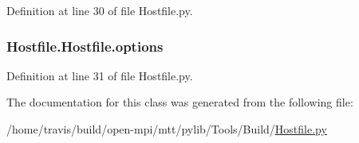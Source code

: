Definition at line 30 of file Hostfile.\-py.

\hypertarget{classHostfile_1_1Hostfile_a3b460597c8d5a628c265573aa532a568}{
\subsubsection[{options}]{\setlength{\rightskip}{0pt plus 5cm}Hostfile.\-Hostfile.\-options}}\label{classHostfile_1_1Hostfile_a3b460597c8d5a628c265573aa532a568}


Definition at line 31 of file Hostfile.\-py.



The documentation for this class was generated from the following file\-:\begin{DoxyCompactItemize}
\item 
/home/travis/build/open-\/mpi/mtt/pylib/\-Tools/\-Build/\hyperlink{Hostfile_8py}{Hostfile.\-py}\end{DoxyCompactItemize}
